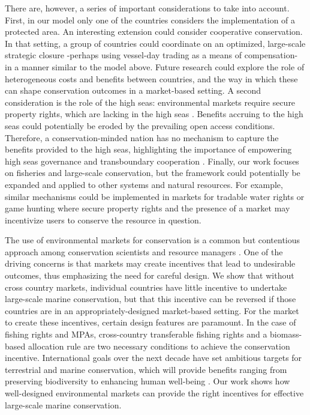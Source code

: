 \documentclass[12pt]{article}
\begin{document}
There are, however, a series of important considerations to take into account. First, in our model only one of the countries considers the implementation of a protected area. An interesting extension could consider cooperative conservation. In that setting, a group of countries could coordinate on an optimized, large-scale strategic closure -perhaps using vessel-day trading as a means of compensation- in a manner similar to the model above. Future research could explore the role of heterogeneous costs and benefits between countries, and the way in which these can shape conservation outcomes in a market-based setting. A second consideration is the role of the high seas: environmental markets require secure property rights, which are lacking in the high seas \cite{crespo_2019}. Benefits accruing to the high seas could potentially be eroded by the prevailing open access conditions. Therefore, a conservation-minded nation has no mechanism to capture the benefits provided to the high seas, highlighting the importance of empowering high seas governance and transboundary cooperation \cite{aqorau_2018,crespo_2019}. Finally, our work focuses on fisheries and large-scale conservation, but the framework could potentially be expanded and applied to other systems and natural resources. For example, similar mechanisms could be implemented in markets for tradable water rights \cite{rosegrant_1994} or game hunting \cite{hutton_2003} where secure property rights and the presence of a market may incentivize users to conserve the resource in question.

The use of environmental markets for conservation is a common but contentious approach among conservation scientists and resource managers \cite{sandbrook_2019}. One of the driving concerns is that markets may create incentives that lead to undesirable outcomes, thus emphasizing the need for careful design. We show that without cross country markets, individual countries have little incentive to undertake large-scale marine conservation, but that this incentive can be reversed if those countries are in an appropriately-designed market-based setting. For the market to create these incentives, certain design features are paramount. In the case of fishing rights and MPAs, cross-country transferable fishing rights and a biomass-based allocation rule are two necessary conditions to achieve the conservation incentive. International goals over the next decade have set ambitious targets for terrestrial and marine conservation, which will provide benefits ranging from preserving biodiversity to enhancing human well-being \cite{oleary_2016,dinerstein_2019,roberts_2017,ban_2019}. Our work shows how well-designed environmental markets can provide the right incentives for effective large-scale marine conservation.
\end{document}
